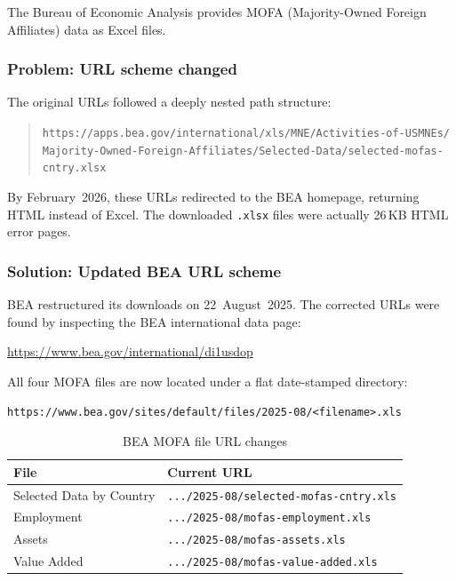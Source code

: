 \documentclass[12pt,a4paper]{article}
\begin{document}
The Bureau of Economic Analysis provides MOFA (Majority-Owned Foreign Affiliates) data as Excel files.

\subsubsection{Problem: URL scheme changed}

The original URLs followed a deeply nested path structure:
\begin{quote}
\small\texttt{https://apps.bea.gov/international/xls/MNE/Activities-of-USMNEs/\\Majority-Owned-Foreign-Affiliates/Selected-Data/selected-mofas-cntry.xlsx}
\end{quote}
By February~2026, these URLs redirected to the BEA homepage, returning HTML instead of Excel.
The downloaded \texttt{.xlsx} files were actually 26\,KB HTML error pages.

\subsubsection{Solution: Updated BEA URL scheme}

BEA restructured its downloads on 22~August~2025.
The corrected URLs were found by inspecting the BEA international data page:
\begin{center}
\url{https://www.bea.gov/international/di1usdop}
\end{center}

All four MOFA files are now located under a flat date-stamped directory:
\begin{center}
\small\texttt{https://www.bea.gov/sites/default/files/2025-08/<filename>.xls}
\end{center}

\begin{table}[H]
\centering
\caption{BEA MOFA file URL changes}
\label{tab:bea_urls}
\small
\begin{tabular}{p{4cm}p{7.5cm}}
\toprule
\textbf{File} & \textbf{Current URL} \\
\midrule
Selected Data by Country & \texttt{.../2025-08/selected-mofas-cntry.xls} \\
Employment & \texttt{.../2025-08/mofas-employment.xls} \\
Assets & \texttt{.../2025-08/mofas-assets.xls} \\
Value Added & \texttt{.../2025-08/mofas-value-added.xls} \\
\bottomrule
\end{tabular}
\end{table}
\end{document}
